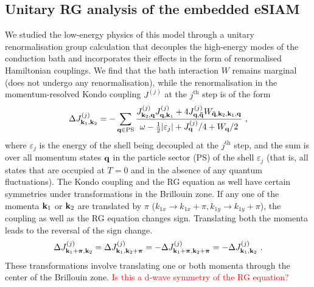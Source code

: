 \documentclass[reprint,hidelinks,onecolumn]{revtex4-2}
\begin{document}
\subsection{Unitary RG analysis of the embedded eSIAM}
We studied the low-energy physics of this model through a unitary renormalisation group calculation that decouples the high-energy modes of the conduction bath and incorporates their effects in the form of renormalised Hamiltonian couplings. We find that the bath interaction \(W\) remains marginal (does not undergo any renormalisation), while the renormalisation in the momentum-resolved Kondo coupling \(J^{(j)}\) at the \(j^\text{th}\) step is of the form
\begin{equation}\begin{aligned}\label{KondoRGequation}
	\Delta J^{(j)}_{{\bf k}_1, {\bf k}_2} = -\sum_{{\bf q} \in \text{PS}} \frac{J^{(j)}_{{\bf k}_2,{\bf q}} J^{(j)}_{{\bf q},{\bf k}_1} + 4J^{(j)}_{{\bf q}, {\bf \bar q}} W_{{\bf \bar q}, {\bf k}_2, {\bf k}_1, {\bf q}}}{\omega - \frac{1}{2}|\varepsilon_j| + J^{(j)}_{{\bf q}}/4 + W_{{\bf q}}/2}~,
\end{aligned}\end{equation}
where \(\varepsilon_j\) is the energy of the shell being decoupled at the \(j^\text{th}\) step, and the sum is over all momentum states \({\bf q}\) in the particle sector (PS) of the shell \(\varepsilon_j\) (that is, all states that are occupied at \(T=0\) and in the absence of any quantum fluctuations). The Kondo coupling and the RG equation as well have certain symmetries under transformations in the Brillouin zone. If any one of the momenta \({\bf k}_1\) or \({\bf k}_2\) are translated by \(\pi\) (\(k_{1x} \to k_{1x} + \pi, k_{1y} \to k_{1y}+\pi\)), the coupling as well as the RG equation changes sign. Translating both the momenta leads to the reversal of the sign change. 
\begin{equation}\begin{aligned}\label{hamiltonanSymms}
	\Delta J^{(j)}_{{\bf k}_1 + \boldsymbol{\pi}, {\bf k}_2} = \Delta J^{(j)}_{{\bf k}_1, {\bf k}_2 + \boldsymbol{\pi}} = -\Delta J^{(j)}_{{\bf k}_1 + \boldsymbol{\pi}, {\bf k}_2 + \boldsymbol{\pi}} = -\Delta J^{(j)}_{{\bf k}_1, {\bf k}_2}~.
\end{aligned}\end{equation}
These transformations involve translating one or both momenta through the center of the Brillouin zone. \textcolor{red}{Is this a d-wave symmetry of the RG equation?}
\end{document}
